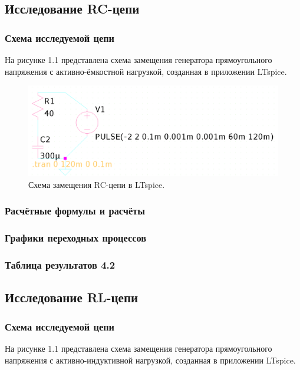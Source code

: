 \subsection{Исследование RC-цепи}

\subsubsection{Схема исследуемой цепи}
На рисунке 1.1 представлена схема замещения генератора прямоугольного напряжения с активно-ёмкостной нагрузкой, созданная в приложении LTspice.

\begin{figure}[H]
	\centering
	\includegraphics[width=1\textwidth]{./data/rc-schema.png}
	\caption{Схема замещения RC-цепи в LTspice.}
\end{figure}

\subsubsection{Расчётные формулы и расчёты}


\subsubsection{Графики переходных процессов}


\subsubsection{Таблица результатов 4.2}





\subsection{Исследование RL-цепи}

\subsubsection{Схема исследуемой цепи}
На рисунке 1.1 представлена схема замещения генератора прямоугольного напряжения с активно-индуктивной нагрузкой, созданная в приложении LTspice.

